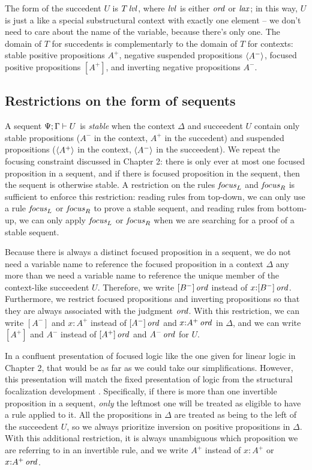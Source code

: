 The form of the succedent $U$ is ${T}\,{{\it lvl}}$, where ${\it lvl}$ is either
${\it ord}$ or ${\it lax}$; in this way, $U$ is just a like a special
substructural context with exactly one element -- we don't need
to care about the name of the variable, because there's only one.  The
domain of $T$ for succedents is complementarly to the domain of $T$
for contexts: stable positive propositions $A^+$, negative suspended
propositions $\langle {A^-} \rangle$, focused positive propositions $[A^+]$, and
inverting negative propositions $A^-$.

\subsection{Restrictions on the form of sequents}

A sequent ${\Psi};{\Gamma} \vdash {U}$ is {\it stable} when the context
$\Delta$ and succeedent $U$ contain only stable propositions ($A^-$ in
the context, $A^+$ in the succedent) and suspended propositions
($\langle {A^+} \rangle$ in the context, $\langle {A^-} \rangle$ in the succeedent). We
repeat the focusing constraint discussed in Chapter 2: there is only
ever at most one focused proposition in a sequent, and if there is
focused proposition in the sequent, then the sequent is otherwise
stable. A restriction on the rules ${\it focus}_L$ and ${\it focus}_R$
is sufficient to enforce this restriction: reading rules from
top-down, we can only use a rule ${\it focus}_L$ or ${\it focus}_R$ to
prove a stable sequent, and reading rules from bottom-up, we can only
apply ${\it focus}_L$ or ${\it focus}_R$ when we are searching for a
proof of a stable sequent.

Because there is always a distinct focused proposition in a sequent,
we do not need a variable name to reference the focused proposition in
a context $\Delta$ any more than we need a variable name to reference
the unique member of the context-like succeedent $U$. Therefore, we
write ${[B^-]}\,{{\it ord}}$ instead of $x{:}{[B^-]}\,{{\it ord}}$. Furthermore,
we restrict focused propositions and inverting propositions so that
they are always associated with the judgment ${\it ord}$. With this
restriction, we can write $[A^-]$ and $x{:}A^+$ instead of
${[A^-]}\,{{\it ord}}$ and $x{:}{A^+}\,{{\it ord}}$ in $\Delta$, and we can write
$[A^+]$ and $A^-$ instead of ${[A^+]}\,{{\it ord}}$ and ${A^-}\,{{\it ord}}$ for
$U$.

In a confluent presentation of focused logic like the one given for
linear logic in Chapter 2, that would be as far as we could take our
simplifications. However, this presentation will match the fixed
presentation of logic from the structural focalization development
\cite{simmons11structural}. Specifically, if there is more than one
invertible proposition in a sequent, {\it only} the leftmost one will
be treated as eligible to have a rule applied to it. All the
propositions in $\Delta$ are treated as being to the left of the
succeedent $U$, so we always prioritize inversion on positive
propositions in $\Delta$. With this additional restriction, it is
always unambiguous which proposition we are referring to in an
invertible rule, and we write $A^+$ instead of $x{:}A^+$ or
$x{:}{A^+}\,{{\it ord}}$.

